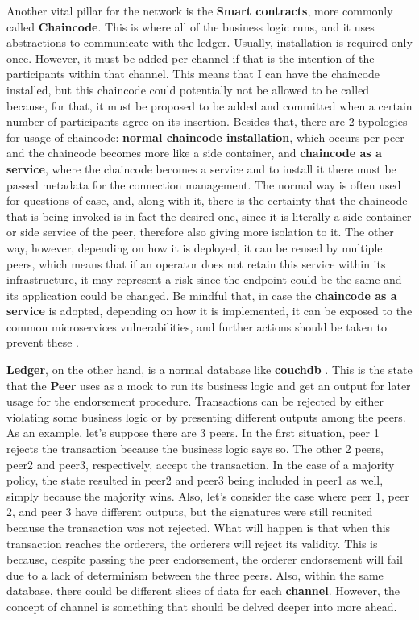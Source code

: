 Another vital pillar for the network is the \textbf{Smart contracts}, more commonly called \textbf{Chaincode}. This is where all of the business logic runs, and it uses abstractions to communicate with the ledger. Usually, installation is required only once. However, it must be added per channel if that is the intention of the participants within that channel. This means that I can have the chaincode installed, but this chaincode could potentially not be allowed to be called because, for that, it must be proposed to be added and committed when a certain number of participants agree on its insertion. Besides that, there are 2 typologies for usage of chaincode: \textbf{normal chaincode installation}, which occurs per peer and the chaincode becomes more like a side container, and \textbf{chaincode as a service}, where the chaincode becomes a service and to install it there must be passed metadata for the connection management. The normal way is often used for questions of ease, and, along with it, there is the certainty that the chaincode that is being invoked is in fact the desired one, since it is literally a side container or side service of the peer, therefore also giving more isolation to it. The other way, however, depending on how it is deployed, it can be reused by multiple peers, which means that if an operator does not retain this service within its infrastructure, it may represent a risk since the endpoint could be the same and its application could be changed. Be mindful that, in case the \textbf{chaincode as a service} is adopted, depending on how it is implemented, it can be exposed to the common microservices vulnerabilities, and further actions should be taken to prevent these \cite{microservices-common-vulnerabilities}.

\textbf{Ledger}, on the other hand, is a normal database like \textbf{couchdb} \cite{couchdb}. This is the state that the \textbf{Peer} uses as a mock to run its business logic and get an output for later usage for the endorsement procedure. Transactions can be rejected by either violating some business logic or by presenting different outputs among the peers. As an example, let's suppose there are 3 peers. In the first situation, peer 1 rejects the transaction because the business logic says so. The other 2 peers, peer2 and peer3, respectively, accept the transaction. In the case of a majority policy, the state resulted in peer2 and peer3 being included in peer1 as well, simply because the majority wins. Also, let's consider the case where peer 1, peer 2, and peer 3 have different outputs, but the signatures were still reunited because the transaction was not rejected. What will happen is that when this transaction reaches the orderers, the orderers will reject its validity. This is because, despite passing the peer endorsement, the orderer endorsement will fail due to a lack of determinism between the three peers. Also, within the same database, there could be different slices of data for each \textbf{channel}. However, the concept of channel is something that should be delved deeper into more ahead.

